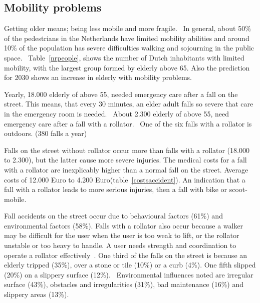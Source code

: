 \subsection{Mobility problems}
Getting older means; being less mobile and more fragile.~\cite{VeiligheidNL2012} In general, about 50\% of the pedestrians in the Netherlands have limited mobility abilities and around 10\% of the population has severe difficulties walking and sojourning in the public space.~\cite{Sauter2010} Table~\ref{nrpeople}, shows the number of Dutch inhabitants with limited mobility, with the largest group formed by elderly above 65. Also the prediction for 2030 shows an increase in elderly with mobility problems.~\cite{Sauter2010} 

Yearly, 18.000 elderly of above 55, needed emergency care after a fall on the street. This means, that every 30 minutes, an elder adult falls so severe that care in the emergency room is needed.~\cite{VeiligheidNL2012} About 2.300 elderly of above 55, need emergency care after a fall with a rollator.~\cite{VeiligheidNL2012} One of the six falls with a rollator is outdoors. (380 falls a year)~\cite{VeiligheidNL2012}

Falls on the street without rollator occur more than falls with a rollator (18.000 to 2.300), but the latter cause more severe injuries. The medical costs for a fall with a rollator are inexplicably higher than a normal fall on the street. Average costs of 12.000 Euro to 4.200 Euro(table~\ref{costsaccident}). An indication that a fall with a rollator leads to more serious injuries, then a fall with bike or scoot-mobile.~\cite{VeiligheidNL2012}

Fall accidents on the street occur due to behavioural factors (61\%) and environmental factors (58\%). Falls with a rollator also occur because a walker may be difficult for the user when the user is too weak to lift, or the rollator unstable or too heavy to handle. A user needs strength and coordination to operate a rollator effectively~\cite{Einbinder2010, Weiss2014}. One third of the falls on the street is because an elderly tripped (35\%), over a stone or tile (10\%) or a curb (4\%). One fifth slipped (20\%) on a slippery surface (12\%).~\cite{VeiligheidNL2012} 
Environmental influences noted are irregular surface (43\%), obstacles and irregularities (31\%), bad maintenance (16\%) and slippery areas (13\%).~\cite{VeiligheidNL2012} 

\renewcommand{\arraystretch}{1.5}

